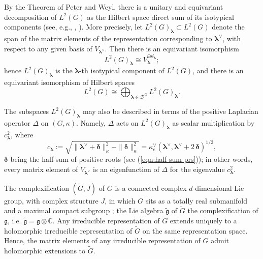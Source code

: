 \documentclass[12pt,a4paper]{article}
\theoremstyle{plain}
\theoremstyle{definition}
\begin{document}
By the Theorem of Peter and Weyl, there is
a unitary and equivariant decomposition of 
$L^2(G)$ as the Hilbert space direct sum
of its isotypical components (see, e.g., \cite{btd},
\cite{s95}). 
More precisely, let $L^2(G)_{\boldsymbol{\lambda}}\subset L^2(G)$
denote the span of the matrix elements of the 
representation corresponding to $\boldsymbol{\lambda}^\vee$,
with respect to any given basis of
$V_{\boldsymbol{\lambda}^\vee}$. Then there is 
an equivariant isomorphism
$$
L^2(G)_{\boldsymbol{\lambda}}\cong 
V_{\boldsymbol{\lambda}}^{\oplus d_{\boldsymbol{\lambda}}};
$$
hence $L^2(G)_{\boldsymbol{\lambda}}$
is the $\boldsymbol{\lambda}$-th isotypical component
of $L^2(G)$, and
there is an equivariant isomorphism
of Hilbert spaces
\begin{equation}
\label{eqn:direct sum decomp}
L^2(G)\cong 
\bigoplus_{\boldsymbol{\lambda}\in \mathcal{D}^G}
L^2(G)_{\boldsymbol{\lambda}}.
\end{equation}

The subspaces $L^2(G)_{\boldsymbol{\lambda}}$ may also be described in terms
of the positive Laplacian operator $\Delta$ on 
$(G,\kappa)$. Namely, $\Delta$ acts on $L^2(G)_{\boldsymbol{\lambda}}$ as 
scalar multiplication by 
$c_{\boldsymbol{\lambda}}^2$, where
\begin{equation}
\label{eqn:eigenvalue of lambda}
c_{\boldsymbol{\lambda}}:=\sqrt{\|\boldsymbol{\lambda}^\vee+\boldsymbol{\delta}\|_\kappa^2
-\|\boldsymbol{\delta}\|_\kappa^2}
=\kappa_e^\vee\left(\boldsymbol{\lambda}^\vee,\boldsymbol{\lambda}^\vee+2\,\boldsymbol{\delta}\right)
^{1/2},
\end{equation}
%
$\boldsymbol{\delta}$ being the half-sum of positive roots
(see (\ref{eqn:half sum prs})); in other words,
every matrix element of 
$V_{\boldsymbol{\lambda}^\vee}$ is an eigenfunction of $\Delta$ for the eigenvalue 
$c_{\boldsymbol{\lambda}}^2$.

The complexification $(\tilde{G},J)$ of
$G$ is a connected complex $d$-dimensional Lie group, 
with complex structure $J$,
in which $G$ sits as a totally real submanifold and a maximal compact subgroup \cite{btd}; the Lie algebra $\tilde{\mathfrak{g}}$
of $\tilde{G}$ the complexification of $\mathfrak{g}$,
i.e. $\tilde{\mathfrak{g}}=\mathfrak{g}\otimes \mathbb{C}$. 
Any irreducible representation of $G$ extends uniquely to
a holomorphic irreducible representation of $\tilde{G}$
on the same representation space.
Hence, the matrix elements of any irreducible
representation of $G$  admit holomorphic extensions
to $\tilde{G}$.
\end{document}
